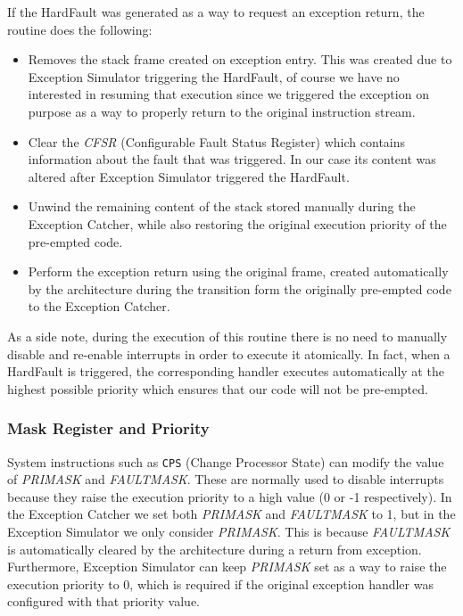 \documentclass{article}
\begin{document}
If the HardFault was generated as a way to request an exception return, the routine does the following:
\begin{itemize}
	\item Removes the stack frame created on exception entry. This was created due to Exception Simulator triggering the HardFault, of course we have no interested in resuming that execution since we triggered the exception on purpose as a way to properly return to the original instruction stream.
	\item Clear the \textit{CFSR} (Configurable Fault Status Register) which contains information about the fault that was triggered. In our case its content was altered after Exception Simulator triggered the HardFault.
	\item Unwind the remaining content of the stack stored manually during the Exception Catcher, while also restoring the original execution priority of the pre-empted code.
	\item Perform the exception return using the original frame, created automatically by the architecture during the transition form the originally pre-empted code to the Exception Catcher.
\end{itemize}

As a side note, during the execution of this routine there is no need to manually disable and re-enable interrupts in order to execute it atomically. In fact, when a HardFault is triggered, the corresponding handler executes automatically at the highest possible priority which ensures that our code will not be pre-empted.

\subsubsection{Mask Register and Priority}
System instructions such as \verb|CPS| (Change Processor State) can modify the value of \textit{PRIMASK} and \textit{FAULTMASK}. These are normally used to disable interrupts because they raise the execution priority to a high value (0 or -1 respectively). In the Exception Catcher we set both \textit{PRIMASK} and \textit{FAULTMASK} to 1, but in the Exception Simulator we only consider \textit{PRIMASK}. This is because \textit{FAULTMASK} is automatically cleared by the architecture during a return from exception. Furthermore, Exception Simulator can keep \textit{PRIMASK} set as a way to raise the execution priority to 0, which is required if the original exception handler was configured with that priority value.
\end{document}
